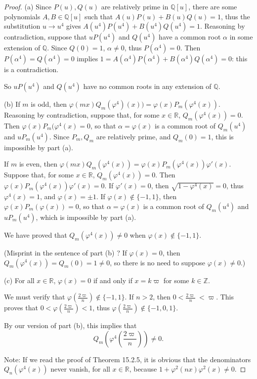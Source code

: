 \documentclass[11pt,a4paper]{article}
\newcommand{\Q}{\mathbb{Q}}
\newcommand{\Z}{\mathbb{Z}}
\newcommand{\R}{\mathbb{R}}
\begin{document}
\begin{proof} 
\item[(a)]
Since $P(u),Q(u)$ are relatively prime in $\Q[u]$, there are some polynomials $A,B \in \Q[u]$ such that $A(u)P(u) + B(u) Q(u) = 1$, thus the substitution $u \to u^4$ gives $A(u^4) P(u^4) + B(u^4)Q(u^4) = 1$. Reasoning by contradiction, suppose that $uP(u^4)$ and $Q(u^4)$ have a common root $\alpha$ in some extension of $\Q$. Since $Q(0) = 1$, $\alpha \ne 0$, thus $P(\alpha^4) = 0$.  Then $P(\alpha^4)= Q(\alpha^4) = 0$ implies $1 = A(\alpha^4) P(\alpha^4) + B(\alpha^4)Q(\alpha^4) = 0$: this is a contradiction. 

So $uP(u^4)$ and $Q(u^4)$ have no common roots in any extension of $\Q$.

\item[(b)] If $m$ is odd, then $\varphi(mx) Q_m(\varphi^4)(x)) = \varphi(x) P_m(\varphi^4(x))$. Reasoning by contradiction, suppose that, for some $x \in \R$, $Q_m(\varphi^4(x)) = 0$. Then $\varphi(x) P_m(\varphi^4(x) = 0$, so that $\alpha = \varphi(x)$ is a common root of $Q_m(u^4)$ and $uP_m(u^4)$. Since $P_m,Q_m$ are relatively prime, and $Q_m(0) = 1$, this is impossible by part (a).

If $m$ is even, then $\varphi(mx) Q_m(\varphi^4(x)) = \varphi(x) P_m(\varphi^4(x)) \varphi'(x)$. Suppose that, for some $x \in \R$, $Q_m(\varphi^4(x)) = 0$. Then $\varphi(x) P_m(\varphi^4(x) ) \varphi'(x)= 0$. If $\varphi'(x) =0$, then $\sqrt{1 - \varphi^4(x)} = 0$, thus $\varphi^4(x) = 1$, and $\varphi(x) = \pm 1$. If $\varphi(x) \not \in \{-1,1\}$, then $\varphi(x) P_m(\varphi(x)) =0$, so that $\alpha = \varphi(x)$ is a common root of $Q_m(u^4)$ and $uP_m(u^4)$, which is impossible by part (a).

We have proved that $Q_m(\varphi^4(x)) \ne 0$ when $\varphi(x)\not \in \{-1,1\}$.

(Misprint in the sentence of part (b) ? If $\varphi(x) = 0$, then $Q_m(\varphi^4(x)) = Q_m(0) = 1 \ne 0$, so there is no need to suppose $\varphi(x) \ne 0$.)
\item[(c)] For all $x \in \R$, $\varphi(x) = 0 $ if and only if $x = k \varpi$ for some $k \in \Z$.

We must verify that $\varphi\left(\frac{2\varpi}{n}\right) \not \in \{-1,1\}$. If $n>2$, then $0<\frac{2\varpi}{n}\ < \varpi$. This proves that $0 < \varphi\left(\frac{2\varpi}{n}\right) <1$, thus $\varphi\left(\frac{2\varpi}{n}\right) \not \in \{-1,0,1\}$.

By our version of part (b), this implies that $$Q_m\left(\varphi^4\left(\frac{2\varpi}{n}\right)\right) \ne 0.$$

Note: If we read the proof of Theorem 15.2.5, it is obvious that the denominators $Q_n(\varphi^4(x))$ never vanish, for all $x \in \R$, because $1 + \varphi^2(nx) \varphi^2(x) \ne 0$.
\end{proof}
\end{document}
